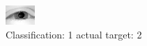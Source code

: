 \begin{figure}[h!]
\begin{center}
\includegraphics[width=0.60\columnwidth]{figures/ID2283_class_1_target_2.png}
\end{center}
\caption{ Classification: 1 actual target: 2}
\label{fig:ID2283_class_1_target_2}
\end{figure}

